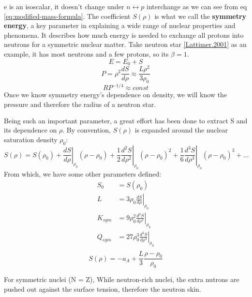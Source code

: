 e is an isoscalar, it doesn't change under $n \leftrightarrow p$ interchange 
as we can see from eq \eqref{eq:modified-mass-formula}. The coefficient $S(\rho)$ is
what we call the \textbf{symmetry energy}, a key parameter in explaining a wide
range of nuclear properties and phenomena. It describes how much energy is needed
to exchange all protons into neutrons for a symmetric nuclear matter. Take 
neutron star \ref{Lattimer.2001} as an example, it has most neutrons and a few 
protons, so its $\beta = 1$.
$$ E = E_0 + S $$
$$ P = \rho^2 \frac{dS}{d\rho} \approx \frac{L\rho^2}{3\rho_0} $$
$$ RP^{-1/4} \approx const $$
Once we know symmetry energy's dependence on density, we will know the pressure
and therefore the radius of a neutron star.

Being such an important parameter, a great effort has been done to extract S 
and its dependence on $\rho$. By convention, $S(\rho)$ is expanded around the
nuclear saturation density $\rho_0$:
\begin{equation}
    S(\rho) = S(\rho_0) 
    + \left.\frac{dS}{d\rho}\right|_{\rho_0}(\rho - \rho_0)
    + \frac{1}{2}\left.\frac{d^2S}{d\rho^2}\right|_{\rho_0}(\rho - \rho_0)^2
    + \frac{1}{6}\left.\frac{d^3S}{d\rho^3}\right|_{\rho_0}(\rho - \rho_0)^3
    + \dots
\end{equation}
From which, we have some other parameters defined:
\begin{equation}
    \begin{aligned}
	S_0 &= S(\rho_0)	\\
	L   &= 3\rho_0\left.\frac{dS}{d\rho}\right|_{\rho_0}	\\
	K_{sym}	&= 9\rho_0^2\left.\frac{d^2S}{d\rho^2}\right|_{\rho_0}	\\
	Q_{sym}	&= 27\rho_0^3\left.\frac{d^3S}{d\rho^3}\right|_{\rho_0}	\\
    \end{aligned}
\end{equation}
$$ S(\rho) = -a_A + \frac{L}{3}\frac{\rho - \rho_0}{\rho_0} $$


For symmetric nuclei (N = Z), 
While neutron-rich nuclei, the extra nutrons are
pushed out against the surface tension\cite{PRL.85.5296}, therefore the neutron skin.

